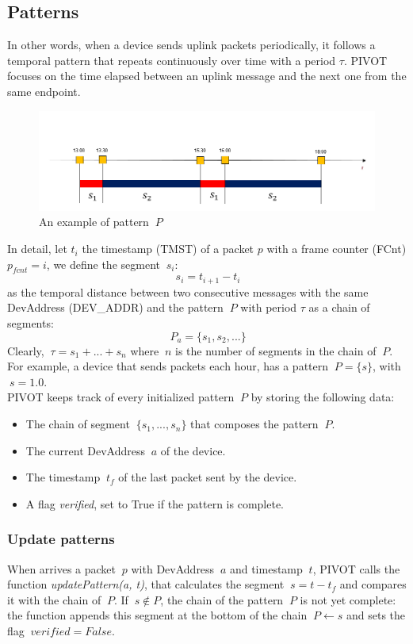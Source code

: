 \subsection{Patterns}
In other words, when a device sends uplink packets periodically, it follows a temporal pattern that repeats continuously over time with a period \(\tau\). PIVOT focuses on the time elapsed between an uplink message and the next one from the same endpoint.
\begin{figure}
    \centering
    \includegraphics[width=0.7\linewidth]{images/pivot/pattern.PNG}
    \caption{An example of pattern \(\ P \)}
    \label{fig:pattern}
\end{figure}
In detail, let \(t_{i}\) the timestamp (TMST) of a packet \(p\) with a frame counter (FCnt) \(p_{fcnt} = i\), we define the segment \(\ s_{i} \):
\[\ s_{i} = t_{i+1} - t_{i} \]
as the temporal distance between two consecutive messages with the same DevAddress (DEV\_ADDR) and the pattern \(\ P \) with period \(\tau\) as a chain of segments: 
\[\ P_{a} = \{ s_{1}, s_{2}, ... \}\]
Clearly, \(\ \tau = s_{1} + ... + s_{n} \) where \(\ n \) is the number of segments in the chain of \(\ P \). For example, a device that sends packets each hour, has a pattern \(\ P = \{s\} \), with \(\ s = 1.0 \).
\\
PIVOT keeps track of every initialized pattern \(\ P \) by storing the following data:
\begin{itemize}
	\item The chain of segment \(\ \{ s_{1}, ..., s_{n} \} \) that composes the pattern \(\ P \).
	\item The current DevAddress \(\ a \) of the device.
	\item The timestamp \(\ t_{f} \) of the last packet sent by the device.
	\item A flag \textit{verified}, set to True if the pattern is complete.
\end{itemize}

\subsubsection{Update patterns}
When arrives a packet \(\ p \) with DevAddress \(\ a \) and timestamp \(\ t \), PIVOT calls the function \textit{updatePattern(a, t)}, that calculates the segment \(\ s = t - t_{f} \) and compares it with the chain of \(\ P \). 
If \(\ s \notin P \), the chain of the pattern \(\ P \) is not yet complete: the function appends this segment at the bottom of the chain \(\ P \gets s \) and sets the flag \(\ verified = False \).

